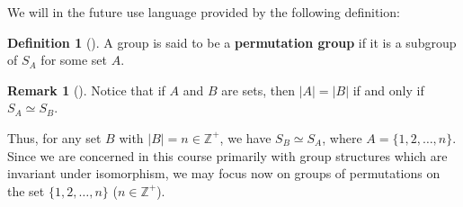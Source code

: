 \documentclass[10pt,]{book}
\newcommand{\terminology}[1]{\textbf{#1}}
\theoremstyle{plain}
\theoremstyle{definition}
\newtheorem{definition}[theorem]{Definition}
\theoremstyle{definition}
\newtheorem{remark}[theorem]{Remark}
\theoremstyle{definition}
\theoremstyle{definition}
\numberwithin{equation}{section}
\def\Z{\mathbb{Z}}
\begin{document}
We will in the future use language provided by the following definition:%
\begin{definition}[{}]\label{definition-46}
A group is said to be a \terminology{permutation group} if it is a subgroup of \(S_A\) for some set \(A\).%
\end{definition}
\begin{remark}[]\label{remark-25}
Notice that if \(A\) and \(B\) are sets, then \(|A|=|B|\) if and only if \(S_A\simeq S_B\).%
\end{remark}
Thus, for any set \(B\) with \(|B|=n \in \Z^+\), we have \(S_B\simeq
S_A\), where \(A=\{1,2,\ldots,n\}\). Since we are concerned in this course primarily with group structures which are invariant under isomorphism, we may focus now on groups of permutations on the set \(\{1,2,\ldots, n\}\) (\(n\in \Z^+\)).%
\typeout{************************************************}
\typeout{************************************************}
\end{document}

